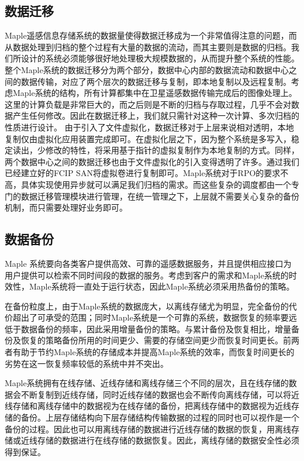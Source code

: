 \documentclass{article}
\begin{document}
\subsection{数据迁移}
Maple遥感信息存储系统的数据量使得数据迁移成为一个非常值得注意的问题，而从数据处理到归档的整个过程有大量的数据的流动，而其主要则是数据的归档。我们所设计的系统必须能够很好地处理极大规模数据的，从而提升整个系统的性能。整个Maple系统的数据迁移分为两个部分，数据中心内部的数据流动和数据中心之间的数据传输，对应了两个层次的数据迁移与复制，即本地复制以及远程复制。考虑Maple系统的结构，所有计算都集中在卫星遥感数据传输完成后的图像处理上。这里的计算负载是非常巨大的，而之后则是不断的归档与存取过程，几乎不会对数据产生任何修改。因此在数据迁移上，我们就只需针对这种一次计算、多次归档的性质进行设计。
由于引入了文件虚拟化，数据迁移对于上层来说相对透明，本地复制仅由虚拟化应用装置完成即可。在虚拟化层之下，因为整个系统是多写入，稳定读出，少修改的特性，将采用基于指针的虚拟复制作为本地复制的方式。同样，两个数据中心之间的数据迁移也由于文件虚拟化的引入变得透明了许多。通过我们已经建立好的FCIP SAN将虚拟卷进行复制即可。Maple系统对于RPO的要求不高，具体实现使用异步就可以满足我们归档的需求。而这些复杂的调度都由一个专门的数据迁移管理模块进行管理，在统一管理之下，上层就不需要关心复杂的备份机制，而只需要处理好业务即可。



\subsection{数据备份}
Maple 系统要向各类客户提供高效、可靠的遥感数据服务，并且提供相应接口为用户提供可以检索不同时间段的数据的服务。考虑到客户的需求和Maple系统的时效性，Maple系统将一直处于运行状态，因此Maple系统必须采用热备份的策略。

在备份粒度上，由于Maple系统的数据庞大，以离线存储尤为明显，完全备份的代价超出了可承受的范围；同时Maple系统是一个可靠的系统，数据恢复的频率要远低于数据备份的频率，因此采用增量备份的策略。与累计备份及恢复相比，增量备份及恢复的策略备份所用的时间更少、需要的存储空间更少而恢复时间更长。前两者有助于节约Maple系统的存储成本并提高Maple系统的效率，而恢复时间更长的劣势在这一恢复频率较低的系统中并不突出。

Maple系统拥有在线存储、近线存储和离线存储三个不同的层次，且在线存储的数据会不断复制到近线存储，同时近线存储的数据也会不断传向离线存储，可以将近线存储和离线存储中的数据视为在线存储的备份，把离线存储中的数据视为近线存储的备份。上层存储结构向下层存储结构传输数据的过程的同时也可以视作是一个备份的过程。因此也可以用离线存储的数据进行近线存储的数据的恢复，用离线存储或近线存储的数据进行在线存储的数据恢复。因此，离线存储的数据安全性必须得到保证。
\end{document}
